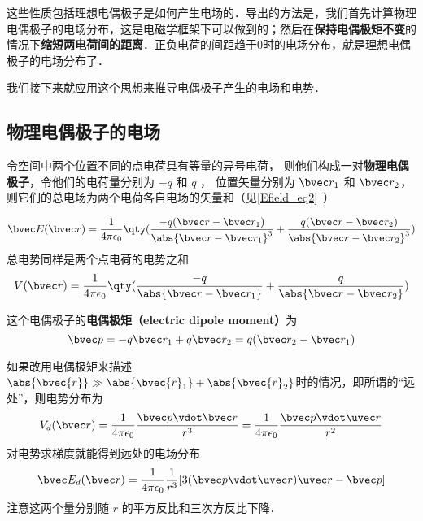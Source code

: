 这些性质包括理想电偶极子是如何产生电场的．导出的方法是，我们首先计算物理电偶极子的电场分布，这是电磁学框架下可以做到的；然后在\textbf{保持电偶极矩不变}的情况下\textbf{缩短两电荷间的距离}．正负电荷的间距趋于$0$时的电场分布，就是理想电偶极子的电场分布了．

我们接下来就应用这个思想来推导电偶极子产生的电场和电势．


\subsection{物理电偶极子的电场}

令空间中两个位置不同的点电荷具有等量的异号电荷， 则他们构成一对\textbf{物理电偶极子}，令他们的电荷量分别为 $-q$ 和 $q$ ， 位置矢量分别为 $\bvec r_1$ 和 $\bvec r_2$， 则它们的总电场为两个电荷各自电场的矢量和（见\autoref{Efield_eq2}~）

\begin{equation}
\bvec E(\bvec r) = \frac{1}{4\pi\epsilon_0} \qty(\frac{-q(\bvec r - \bvec r_1)}{\abs{\bvec r - \bvec r_1}^3} + \frac{q(\bvec r - \bvec r_2)}{\abs{\bvec r - \bvec r_2}^3})
\end{equation}
总电势同样是两个点电荷的电势之和%
\begin{equation}\label{eleDpl_eq4}
V(\bvec r) = \frac{1}{4\pi\epsilon_0} \qty(\frac{-q}{\abs{\bvec r - \bvec r_1}} + \frac{q}{\abs{\bvec r - \bvec r_2}})
\end{equation}


这个电偶极子的\textbf{电偶极矩（electric dipole moment）}为
\begin{equation}\label{eleDpl_eq1}
\bvec p = -q \bvec r_1 + q \bvec r_2 = q (\bvec r_2 - \bvec r_1)
\end{equation} 

如果改用电偶极矩来描述$\abs{\bvec{r}}\gg\\\abs{\bvec{r}_1}+\abs{\bvec{r}_2}$时的情况，即所谓的“远处”，则电势分布为
\begin{equation}\label{eleDpl_eq2}
V_d(\bvec r) = \frac{1}{4\pi\epsilon_0} \frac{\bvec p\vdot \bvec r}{r^3} = \frac{1}{4\pi\epsilon_0} \frac{\bvec p \vdot \uvec r}{r^2}
\end{equation}
对电势求梯度就能得到远处的电场分布
\begin{equation}\label{eleDpl_eq3}
\bvec E_d(\bvec r) = \frac{1}{4\pi\epsilon_0} \frac{1}{r^3} [3(\bvec p \vdot \uvec r) \uvec r - \bvec p]
\end{equation}
注意这两个量分别随 $r$ 的平方反比和三次方反比下降．

